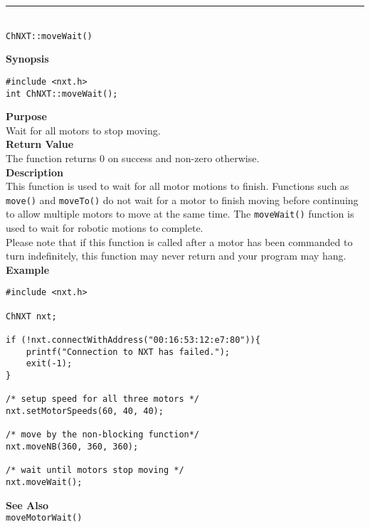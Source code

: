 \noindent
\vspace{5pt}
\rule{4.5in}{0.015in}\\
\noindent
{\LARGE \texttt{ChNXT::moveWait()}}\\
{}

\noindent
{\bf Synopsis}
\begin{lstlisting}
#include <nxt.h>
int ChNXT::moveWait();
\end{lstlisting}

\noindent
{\bf Purpose}\\
Wait for all motors to stop moving.\\

\noindent
{\bf Return Value}\\
The function returns 0 on success and non-zero otherwise.\\

\noindent
{\bf Description}\\
This function is used to wait for all motor motions to finish. Functions such as
\texttt{move()} and \texttt{moveTo()} do not wait for a motor to finish
moving before continuing to allow multiple motors to move at the same time. The
\texttt{moveWait()} function is used to wait for robotic motions to complete.\\

\noindent
Please note that if this function is called after a motor has been commanded to
turn indefinitely, this function may never return and your program may hang.\\

\noindent
{\bf Example}
\begin{lstlisting}
#include <nxt.h> 

ChNXT nxt;

if (!nxt.connectWithAddress("00:16:53:12:e7:80")){
    printf("Connection to NXT has failed.");
    exit(-1);
}
 
/* setup speed for all three motors */
nxt.setMotorSpeeds(60, 40, 40);

/* move by the non-blocking function*/
nxt.moveNB(360, 360, 360);

/* wait until motors stop moving */
nxt.moveWait();
\end{lstlisting}


\noindent
{\bf See Also}\\
\texttt{moveMotorWait()}

